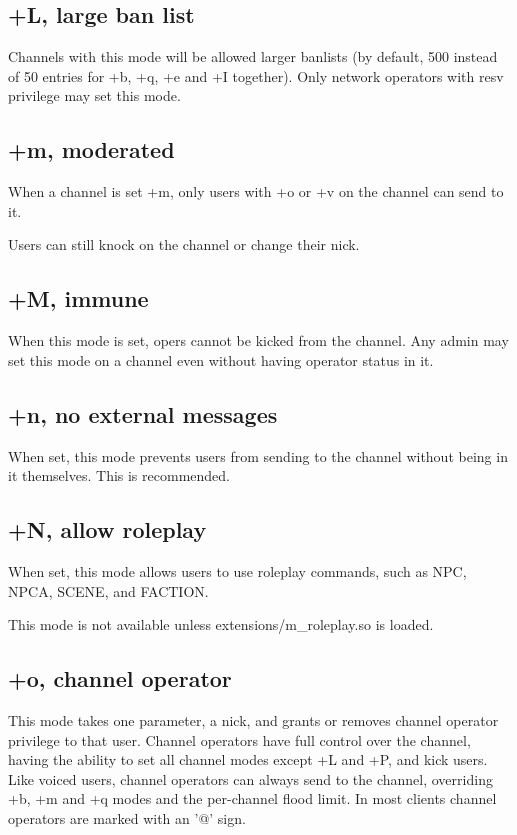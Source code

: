 \subsection{+L, large ban list}

	Channels with this mode will be allowed larger banlists (by default,
	500 instead of 50 entries for +b, +q, +e and +I together). Only network
	operators with resv privilege may set this mode.


\subsection{+m, moderated}

	When a channel is set +m, only users with +o or +v on the channel can
	send to it.

	Users can still knock on the channel or change their nick.


\subsection{+M, immune}

	When this mode is set, opers cannot be kicked from the channel.
	Any admin may set this mode on a channel even without having operator
	status in it.


\subsection{+n, no external messages}

	When set, this mode prevents users from sending to the channel without
	being in it themselves. This is recommended.


\subsection{+N, allow roleplay}

	When set, this mode allows users to use roleplay commands, such as NPC,
	NPCA, SCENE, and FACTION.

	This mode is not available unless extensions/m\_roleplay.so is loaded.


\subsection{+o, channel operator}

	This mode takes one parameter, a nick, and grants or removes channel
	operator privilege to that user. Channel operators have full control
	over the channel, having the ability to set all channel modes except
	+L and +P, and kick users. Like voiced users, channel operators can
	always send to the channel, overriding +b, +m and +q modes and the
	per-{}channel flood limit.
	In most clients channel operators are marked with an '@' sign.


